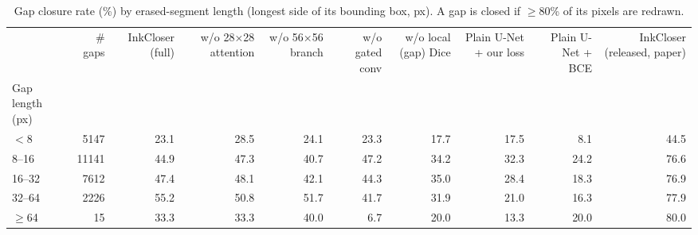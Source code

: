 \begin{table}
\caption{Gap closure rate (\%) by erased-segment length (longest side of its bounding box, px). A gap is closed if $\geq$80\% of its pixels are redrawn.}
\label{tab:gap_length}
\begin{tabular}{lrrrrrrrrr}
\toprule
 & \# gaps & InkCloser (full) & w/o 28×28 attention & w/o 56×56 branch & w/o gated conv & w/o local (gap) Dice & Plain U-Net + our loss & Plain U-Net + BCE & InkCloser (released, paper) \\
Gap length (px) &  &  &  &  &  &  &  &  &  \\
\midrule
$<$8 & 5147 & 23.1 & 28.5 & 24.1 & 23.3 & 17.7 & 17.5 & 8.1 & 44.5 \\
8--16 & 11141 & 44.9 & 47.3 & 40.7 & 47.2 & 34.2 & 32.3 & 24.2 & 76.6 \\
16--32 & 7612 & 47.4 & 48.1 & 42.1 & 44.3 & 35.0 & 28.4 & 18.3 & 76.9 \\
32--64 & 2226 & 55.2 & 50.8 & 51.7 & 41.7 & 31.9 & 21.0 & 16.3 & 77.9 \\
$\geq$64 & 15 & 33.3 & 33.3 & 40.0 & 6.7 & 20.0 & 13.3 & 20.0 & 80.0 \\
\bottomrule
\end{tabular}
\end{table}
